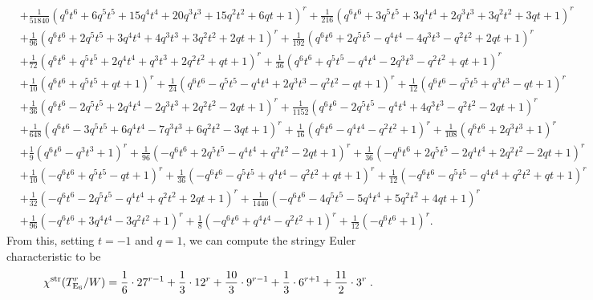 \documentclass[11pt,english]{amsart}
\numberwithin{equation}{section}
\numberwithin{figure}{section}
\theoremstyle{plain}
\theoremstyle{plain}
\theoremstyle{definition}
\theoremstyle{remark}
\newcommand{\E}{\operatorname{E}}
\newcommand{\str}{\textup{str}}
\begin{document}
{\begin{align*}
 & + \frac{1}{51840}  {\left(q^{6} t^{6} + 6  q^{5} t^{5} + 15  q^{4} t^{4} + 20  q^{3} t^{3} + 15  q^{2} t^{2} + 6  q t + 1\right)}^{r} + \frac{1}{216}  {\left(q^{6} t^{6} + 3  q^{5} t^{5} + 3  q^{4} t^{4} + 2  q^{3} t^{3} + 3  q^{2} t^{2} + 3  q t + 1\right)}^{r} \\
 & + \frac{1}{96}  {\left(q^{6} t^{6} + 2  q^{5} t^{5} + 3  q^{4} t^{4} + 4  q^{3} t^{3} + 3  q^{2} t^{2} + 2  q t + 1\right)}^{r} + \frac{1}{192}  {\left(q^{6} t^{6} + 2  q^{5} t^{5} - q^{4} t^{4} - 4  q^{3} t^{3} - q^{2} t^{2} + 2  q t + 1\right)}^{r} \\
 & + \frac{1}{72}  {\left(q^{6} t^{6} + q^{5} t^{5} + 2  q^{4} t^{4} + q^{3} t^{3} + 2  q^{2} t^{2} + q t + 1\right)}^{r} + \frac{1}{36}  {\left(q^{6} t^{6} + q^{5} t^{5} - q^{4} t^{4} - 2  q^{3} t^{3} - q^{2} t^{2} + q t + 1\right)}^{r} \\
 & + \frac{1}{10}  {\left(q^{6} t^{6} + q^{5} t^{5} + q t + 1\right)}^{r} + \frac{1}{24}  {\left(q^{6} t^{6} - q^{5} t^{5} - q^{4} t^{4} + 2  q^{3} t^{3} - q^{2} t^{2} - q t + 1\right)}^{r} + \frac{1}{12}  {\left(q^{6} t^{6} - q^{5} t^{5} + q^{3} t^{3} - q t + 1\right)}^{r} \\
 & + \frac{1}{36}  {\left(q^{6} t^{6} - 2  q^{5} t^{5} + 2  q^{4} t^{4} - 2  q^{3} t^{3} + 2  q^{2} t^{2} - 2  q t + 1\right)}^{r} + \frac{1}{1152}  {\left(q^{6} t^{6} - 2  q^{5} t^{5} - q^{4} t^{4} + 4  q^{3} t^{3} - q^{2} t^{2} - 2  q t + 1\right)}^{r} \\
 & + \frac{1}{648}  {\left(q^{6} t^{6} - 3  q^{5} t^{5} + 6  q^{4} t^{4} - 7  q^{3} t^{3} + 6  q^{2} t^{2} - 3  q t + 1\right)}^{r} + \frac{1}{16}  {\left(q^{6} t^{6} - q^{4} t^{4} - q^{2} t^{2} + 1\right)}^{r} + \frac{1}{108}  {\left(q^{6} t^{6} + 2  q^{3} t^{3} + 1\right)}^{r} \\
 & + \frac{1}{9}  {\left(q^{6} t^{6} - q^{3} t^{3} + 1\right)}^{r} + \frac{1}{96}  {\left(-q^{6} t^{6} + 2  q^{5} t^{5} - q^{4} t^{4} + q^{2} t^{2} - 2  q t + 1\right)}^{r} + \frac{1}{36}  {\left(-q^{6} t^{6} + 2  q^{5} t^{5} - 2  q^{4} t^{4} + 2  q^{2} t^{2} - 2  q t + 1\right)}^{r} \\
 & + \frac{1}{10}  {\left(-q^{6} t^{6} + q^{5} t^{5} - q t + 1\right)}^{r} + \frac{1}{36}  {\left(-q^{6} t^{6} - q^{5} t^{5} + q^{4} t^{4} - q^{2} t^{2} + q t + 1\right)}^{r} + \frac{1}{12}  {\left(-q^{6} t^{6} - q^{5} t^{5} - q^{4} t^{4} + q^{2} t^{2} + q t + 1\right)}^{r} \\
 & + \frac{1}{32}  {\left(-q^{6} t^{6} - 2  q^{5} t^{5} - q^{4} t^{4} + q^{2} t^{2} + 2  q t + 1\right)}^{r} + \frac{1}{1440}  {\left(-q^{6} t^{6} - 4  q^{5} t^{5} - 5  q^{4} t^{4} + 5  q^{2} t^{2} + 4  q t + 1\right)}^{r} \\
 & + \frac{1}{96}  {\left(-q^{6} t^{6} + 3  q^{4} t^{4} - 3  q^{2} t^{2} + 1\right)}^{r} + \frac{1}{8}  {\left(-q^{6} t^{6} + q^{4} t^{4} - q^{2} t^{2} + 1\right)}^{r} + \frac{1}{12}  {\left(-q^{6} t^{6} + 1\right)}^{r}.
\end{align*}
}
From this, setting $t = -1$ and $q = 1$, we can compute the stringy Euler characteristic to be
$$
\chi^{\str}(T_{\E_6}^r/W) = \frac{1}{6} \cdot 27^{r - 1} + \frac{1}{3} \cdot 12^{r} + \frac{10}{3} \cdot 9^{r - 1} + \frac{1}{3} \cdot 6^{r + 1} + \frac{11}{2} \cdot 3^{r}\; .
$$
\end{document}
